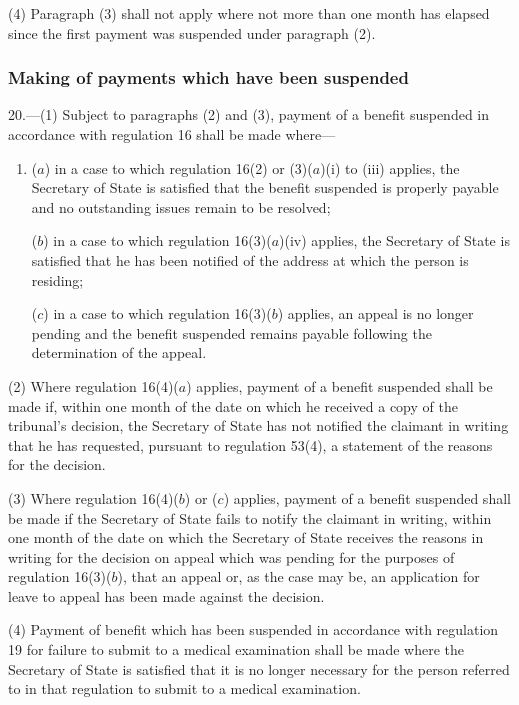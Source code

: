 \documentclass[12pt,a4paper]{article}
\begin{document}
(4) Paragraph (3) shall not apply where not more than one month has elapsed since the first payment was suspended under paragraph (2).

\subsubsection[20. Making of payments which have been suspended]{Making of payments which have been suspended}

20.—(1) Subject to paragraphs (2) and (3), payment of a benefit suspended in accordance with regulation 16 shall be made where—
\begin{enumerate}\item[]
($a$) in a case to which regulation 16(2) or (3)($a$)(i) to (iii) applies, the Secretary of State is satisfied that the benefit suspended is properly payable and no outstanding issues remain to be resolved;

($b$) in a case to which regulation 16(3)($a$)(iv) applies, the Secretary of State is satisfied that he has been notified of the address at which the person is residing;

($c$) in a case to which regulation 16(3)($b$) applies, an appeal is no longer pending and the benefit suspended remains payable following the determination of the appeal.
\end{enumerate}

(2) Where regulation 16(4)($a$) applies, payment of a benefit suspended shall be made if, within one month of the date on which he received a copy of the tribunal’s decision, the Secretary of State has not notified the claimant in writing that he has requested, pursuant to regulation 53(4), a statement of the reasons for the decision.

(3) Where regulation 16(4)($b$) or ($c$) applies, payment of a benefit suspended shall be made if the Secretary of State fails to notify the claimant in writing, within one month of the date on which the Secretary of State receives the reasons in writing for the decision on appeal which was pending for the purposes of regulation 16(3)($b$), that an appeal or, as the case may be, an application for leave to appeal has been made against the decision.

(4) Payment of benefit which has been suspended in accordance with regulation 19 for failure to submit to a medical examination shall be made where the Secretary of State is satisfied that it is no longer necessary for the person referred to in that regulation to submit to a medical examination.
\end{document}
